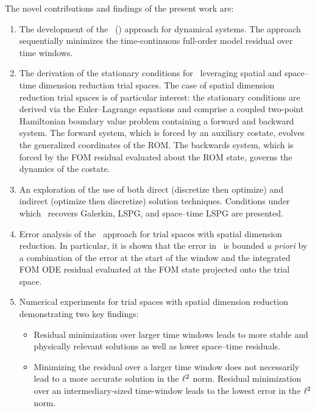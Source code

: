 \documentclass[3p,computermodern,10pt]{elsarticle}
\begin{document}
 The novel contributions and findings of the present work are:
\begin{enumerate}
\item The development of the \methodName\ (\methodAcronym) approach for dynamical systems. The approach sequentially minimizes the time-continuous full-order model residual over time windows.
\item The derivation of the stationary conditions for \methodAcronymROMs\ leveraging spatial and space--time dimension reduction trial spaces. The case of spatial dimension reduction trial spaces is of particular interest: the stationary conditions are derived via the Euler--Lagrange equations and comprise a coupled 
two-point Hamiltonian boundary value problem containing a forward and backward system. The forward system, which is forced by an auxiliary costate, evolves the generalized coordinates of the ROM. The backwards system, which is forced by the FOM residual evaluated about the ROM state, governs the dynamics of the costate. 
\item An exploration of the use of both direct (discretize then optimize) and indirect (optimize then discretize) solution techniques. Conditions under which \methodAcronym\ recovers Galerkin, LSPG, and space--time LSPG are presented.
\item Error analysis of the \methodAcronym\ approach for trial spaces with spatial dimension reduction. In particular, it is shown that the error in \methodAcronymROMs\ is bounded \textit{a priori} by a combination of the error at the start of the window and the integrated FOM ODE residual evaluated at the FOM state projected onto the trial space. 
\item Numerical experiments for trial spaces with spatial dimension reduction demonstrating two key findings:
\begin{itemize}
\item Residual minimization over larger time windows leads to more stable and physically relevant solutions as well as lower space--time residuals. 
\item Minimizing the residual over a larger time window does not necessarily lead to a more accurate solution in the $\ell^2$ norm. Residual 
minimization over an intermediary-sized time-window leads to the lowest error in the $\ell^2$ norm.
\end{itemize}
\end{enumerate}
\end{document}
